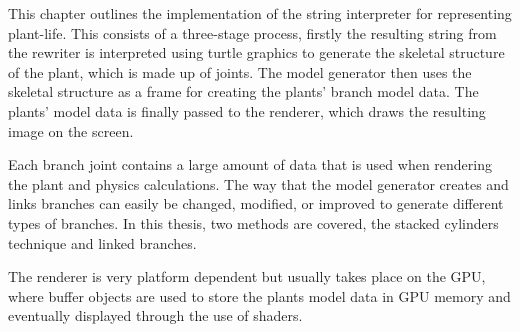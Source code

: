This chapter outlines the implementation of the string interpreter for representing plant-life. This consists of a three-stage process, firstly the resulting string from the rewriter is interpreted using turtle graphics to generate the skeletal structure of the plant, which is made up of joints. The model generator then uses the skeletal structure as a frame for creating the plants' branch model data. The plants' model data is finally passed to the renderer, which draws the resulting image on the screen. 

Each branch joint contains a large amount of data that is used when rendering the plant and physics calculations. The way that the model generator creates and links branches can easily be changed, modified, or improved to generate different types of branches. In this thesis, two methods are covered, the stacked cylinders technique and linked branches. 

The renderer is very platform dependent but usually takes place on the GPU, where buffer objects are used to store the plants model data in GPU memory and eventually displayed through the use of shaders.







